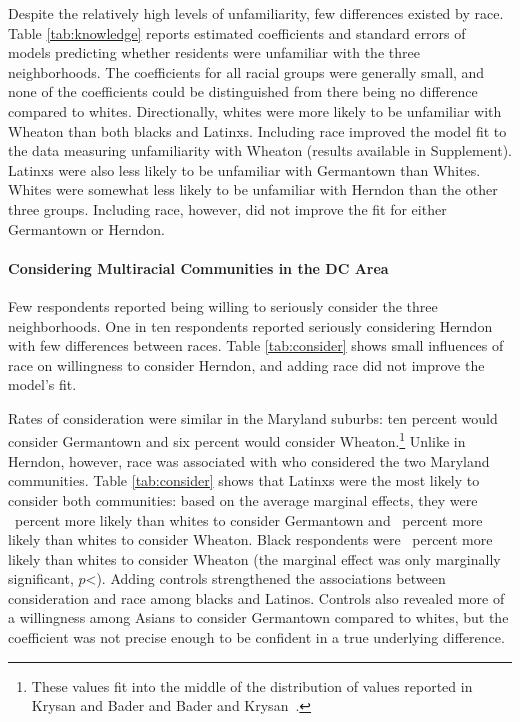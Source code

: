 \documentclass{baderart}
\begin{document}
Despite the relatively high levels of unfamiliarity, few differences existed by race. Table \ref{tab:knowledge} reports estimated coefficients and standard errors of models predicting whether residents were unfamiliar with the three neighborhoods. The coefficients for all racial groups were generally small, and none of the coefficients could be distinguished from there being no difference compared to whites. Directionally, whites were more likely to be unfamiliar with Wheaton than both blacks and Latinxs. Including race improved the model fit to the data measuring unfamiliarity with Wheaton (results available in Supplement). Latinxs were also less likely to be unfamiliar with Germantown than Whites. Whites were somewhat less likely to be unfamiliar with Herndon than the other three groups. Including race, however, did not improve the fit for either Germantown or Herndon. 


\paragraph{Considering Multiracial Communities in the DC Area}
Few respondents reported being willing to seriously consider the three neighborhoods. One in ten respondents reported seriously considering Herndon with few differences between races. Table \ref{tab:consider} shows small influences of race on willingness to consider Herndon, and adding race did not improve the model's fit. 


Rates of consideration were similar in the Maryland suburbs: ten percent would consider Germantown and six percent would consider Wheaton.\footnote{These values fit into the middle of the distribution of values reported in Krysan and Bader \citeyearpar{krysan_perceiving_2007} and Bader and Krysan~\citeyearpar{bader_community_2015}.} Unlike in Herndon, however, race was associated with who considered the two Maryland communities. Table \ref{tab:consider} shows that Latinxs were the most likely to consider both communities: based on the average marginal effects, they were \conameonelatinogerman~percent more likely than whites to consider Germantown and \conameonelatinowheaton~percent more likely than whites to consider Wheaton. Black respondents were \conameoneblackwheaton~percent more likely than whites to consider Wheaton (the marginal effect was only marginally significant, $p$<\conameoneblackwheatonp). Adding controls strengthened the associations between consideration and race among blacks and Latinos. Controls also revealed more of a willingness among Asians to consider Germantown compared to whites, but the coefficient was not precise enough to be confident in a true underlying difference. 
\end{document}
